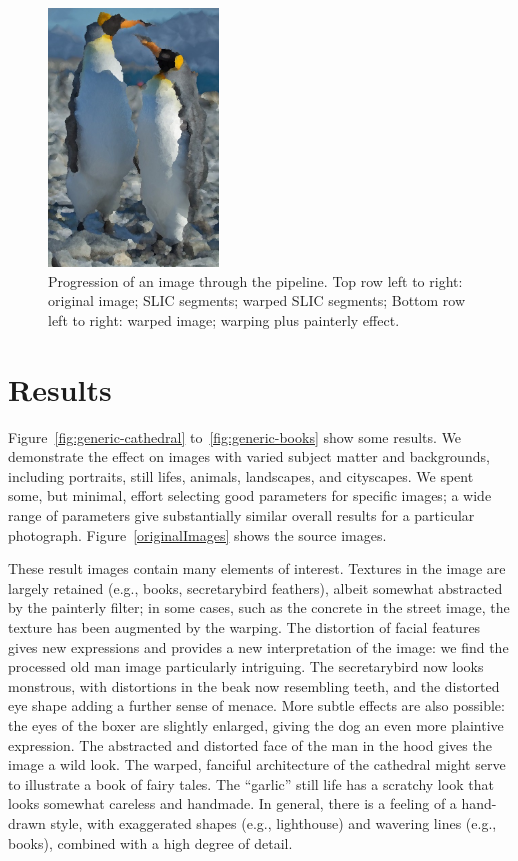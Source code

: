 \begin{figure}[htbp]
\includegraphics[height=2.7in]{images/penguin-pipe-5.jpg}
\caption{Progression of an image through the pipeline. Top row left to right: original image; SLIC segments; warped SLIC segments; Bottom row left to right: warped image; warping plus painterly effect.}
\label{fig:penguin}
\end{figure}


%
%
\section{Results} \label{resultIW}

Figure~\ref{fig:generic-cathedral} to~\ref{fig:generic-books} show some results. 
We demonstrate the effect on images with varied subject matter and backgrounds,
including portraits, still lifes, animals,
landscapes, and cityscapes. We spent some, but minimal, effort selecting good parameters for
specific images; a wide range of parameters give substantially similar overall results for a particular
photograph.  Figure~\ref{originalImages} shows the source images.

These result images contain many elements of interest. Textures in the image are largely retained
(e.g., books, secretarybird feathers), albeit 
somewhat abstracted by the painterly filter; in some cases, such as the concrete in the street image, the
texture has been augmented by the warping. The distortion of facial features gives new expressions and
provides a new interpretation of the image: we find the processed old man image particularly intriguing.
The secretarybird now looks monstrous, with distortions in the beak now resembling teeth, and the 
distorted eye shape adding a further sense of menace. More subtle effects are also possible: the eyes
of the boxer are slightly enlarged, giving the dog an even more plaintive expression. The abstracted and distorted face of the man in the hood 
gives the image a wild look. The warped, fanciful architecture of the cathedral
might serve to illustrate a book of fairy tales. The ``garlic'' still life has a scratchy look that looks somewhat 
careless and handmade.
In general, there is a feeling of a hand-drawn style, with exaggerated shapes (e.g., lighthouse) and
wavering lines (e.g., books), combined with a high degree of detail.

